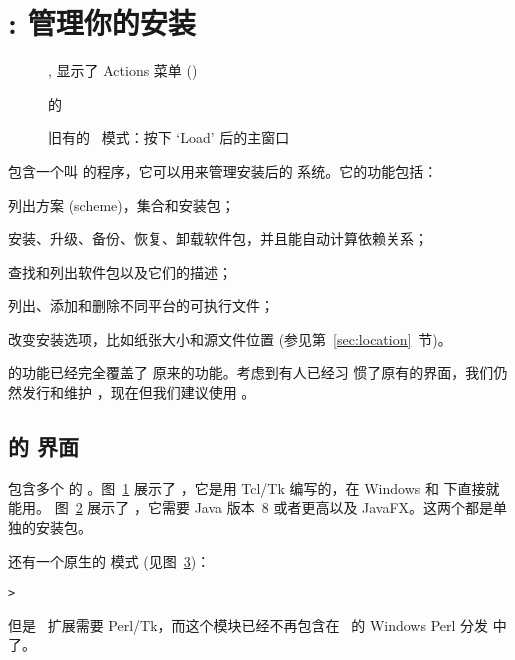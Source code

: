 \documentclass{article}
\begin{document}
\section{: 管理你的安装}
\label{sec:tlmgr}


\begin{figure}[tb]
\caption{ \GUI, 显示了 Actions 菜单 (\MacOSX)}
\label{fig:tlshell}
\end{figure}

\begin{figure}[tb]
\caption{ 的  \GUI{}}
\label{fig:tlcockpit}
\end{figure}

\begin{figure}[tb]
\caption{旧有的  \GUI\ 模式：按下 `Load' 后的主窗口}
\label{fig:tlmgr-gui}
\end{figure}

\TL{} 包含一个叫  的程序，它可以用来管理安装后的
系统。它的功能包括：

\begin{itemize*}
\item 列出方案 (scheme)，集合和安装包；
\item 安装、升级、备份、恢复、卸载软件包，并且能自动计算依赖关系；
\item 查找和列出软件包以及它们的描述；
\item 列出、添加和删除不同平台的可执行文件；
\item 改变安装选项，比如纸张大小和源文件位置 (参见第~\ref{sec:location}~节)。
\end{itemize*}

 的功能已经完全覆盖了  原来的功能。考虑到有人已经习
惯了原有的界面，我们仍然发行和维护 ，现在但我们建议使用
。

\subsection{ 的 \GUI{} 界面}

\TL{} 包含多个  的 \GUI{}。图~\ref{fig:tlshell} 展示了
，它是用 Tcl/Tk 编写的，在 Windows 和 \MacOSX{} 下直接就能用。
图~\ref{fig:tlcockpit} 展示了 ，它需要 Java 版本~8 或者更高以及
JavaFX。这两个都是单独的安装包。

 还有一个原生的 \GUI{} 模式 (见图~\ref{fig:tlmgr-gui})：
\begin{alltt}
> 
\end{alltt}
但是 \GUI\ 扩展需要 Perl/Tk，而这个模块已经不再包含在 \TL\ 的 Windows Perl 分发
中了。
\end{document}
